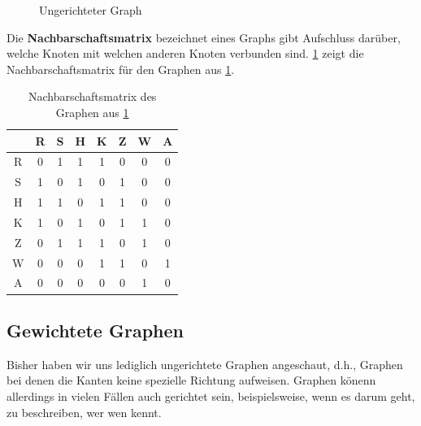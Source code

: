 \begin{figure}[H]
\centering

\caption{Ungerichteter Graph}
\label{fig:ex-graph-2}
\end{figure}

Die \textbf{Nachbarschaftsmatrix} bezeichnet eines Graphs gibt Aufschluss darüber, welche Knoten mit welchen anderen Knoten verbunden sind. \cref{tab:nachbarschaft-ex-1} zeigt die Nachbarschaftsmatrix für den Graphen aus \cref{fig:ex-graph-2}.

\begin{table}[H]
\centering
\begin{tabular}{c||c|c|c|c|c|c|c}
  & R & S & H & K & Z & W & A \\ \midrule
R & 0 & 1 & 1 & 1 & 0 & 0 & 0\\ \hline
S & 1 & 0 & 1 & 0 & 1 & 0 & 0\\ \hline
H & 1 & 1 & 0 & 1 & 1 & 0 & 0\\ \hline
K & 1 & 0 & 1 & 0 & 1 & 1 & 0\\ \hline
Z & 0 & 1 & 1 & 1 & 0 & 1 & 0\\ \hline
W & 0 & 0 & 0 & 1 & 1 & 0 & 1\\ \hline
A & 0 & 0 & 0 & 0 & 0 & 1 & 0\\ 
\end{tabular}
\caption{Nachbarschaftsmatrix des Graphen aus \cref{fig:ex-graph-2}}
\label{tab:nachbarschaft-ex-1}
\end{table}


\subsection{Gewichtete Graphen}
Bisher haben wir uns lediglich ungerichtete Graphen angeschaut, d.h., Graphen bei denen die Kanten keine spezielle Richtung aufweisen. Graphen könenn allerdings in vielen Fällen auch gerichtet sein, beispielsweise, wenn es darum geht, zu beschreiben, wer wen kennt.


